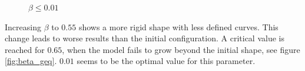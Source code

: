 \begin{figure}[!hbt]
\centering   
{}
\caption{$\beta \leq 0.01$}
\label{fig:beta_leq}
\end{figure}

Increasing $\beta$ to $0.55$ shows a more rigid shape with less defined curves. This change leads to worse results than the initial configuration. A critical value is reached for $0.65$, when the model fails to grow beyond the initial shape, see figure \ref{fig:beta_geq}. $0.01$ seems to be the optimal value for this parameter.

